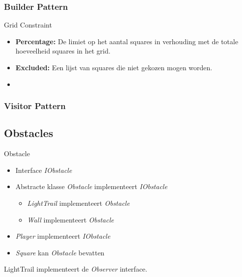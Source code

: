 \documentclass[t]{beamer}
\begin{document}
\subsubsection{Builder Pattern}
\begin{frame}
\begin{center}

\end{center}
\end{frame}
\begin{frame}{Grid Constraint}
\begin{itemize}
	\item \textbf{Percentage:} De limiet op het aantal squares in verhouding met de totale hoeveelheid squares in het grid.
	\item \textbf{Excluded:} Een lijst van squares die niet gekozen mogen worden.
	\item 
\end{itemize}
\end{frame}

\subsubsection{Visitor Pattern}
\begin{frame}
\begin{center}

\end{center}
\end{frame}
\subsection{Obstacles}
\begin{frame}{Obstacle}
\begin{center}
\begin{itemize}
	\item Interface \textit{IObstacle}
	\item  Abstracte klasse \textit{Obstacle} implementeert \textit{IObstacle}
	\begin{itemize}
		\item \textit{LightTrail} implementeert \textit{Obstacle}
		\item \textit{Wall} implementeert \textit{Obstacle}
	\end{itemize}
	\item \textit{Player} implementeert \textit{IObstacle}
	\item \textit{Square} kan \textit{Obstacle} bevatten
\end{itemize}
LightTrail implementeert de \textit{Observer} interface.
\end{center}
\end{frame}
\end{document}
